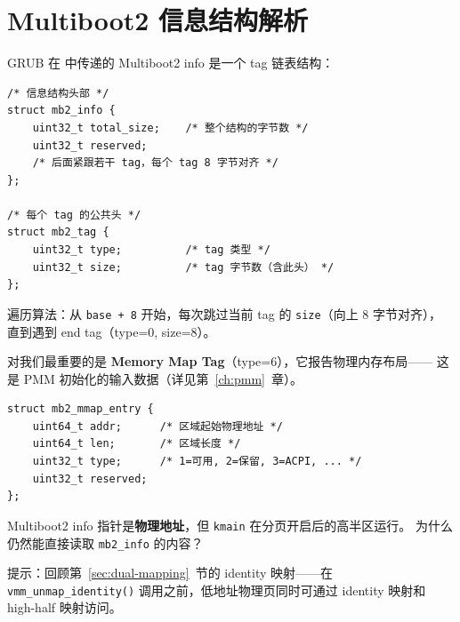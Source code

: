 \section{Multiboot2 信息结构解析}
\label{sec:mb2-info}

GRUB 在  中传递的 Multiboot2 info 是一个 tag 链表结构：

\begin{lstlisting}[style=cstyle]
/* 信息结构头部 */
struct mb2_info {
    uint32_t total_size;    /* 整个结构的字节数 */
    uint32_t reserved;
    /* 后面紧跟若干 tag，每个 tag 8 字节对齐 */
};

/* 每个 tag 的公共头 */
struct mb2_tag {
    uint32_t type;          /* tag 类型 */
    uint32_t size;          /* tag 字节数（含此头） */
};
\end{lstlisting}

遍历算法：从 \texttt{base + 8} 开始，每次跳过当前 tag 的 \texttt{size}（向上 8 字节对齐），
直到遇到 end tag（type=0, size=8）。

对我们最重要的是 \textbf{Memory Map Tag}（type=6），它报告物理内存布局——
这是 PMM 初始化的输入数据（详见第~\ref{ch:pmm}~章）。

\begin{lstlisting}[style=cstyle]
struct mb2_mmap_entry {
    uint64_t addr;      /* 区域起始物理地址 */
    uint64_t len;       /* 区域长度 */
    uint32_t type;      /* 1=可用, 2=保留, 3=ACPI, ... */
    uint32_t reserved;
};
\end{lstlisting}

\begin{thinkbox}
Multiboot2 info 指针是\textbf{物理地址}，但 \texttt{kmain} 在分页开启后的高半区运行。
为什么仍然能直接读取 \texttt{mb2\_info} 的内容？

提示：回顾第~\ref{sec:dual-mapping}~节的 identity 映射——在 \texttt{vmm\_unmap\_identity()}
调用之前，低地址物理页同时可通过 identity 映射和 high-half 映射访问。
\end{thinkbox}


